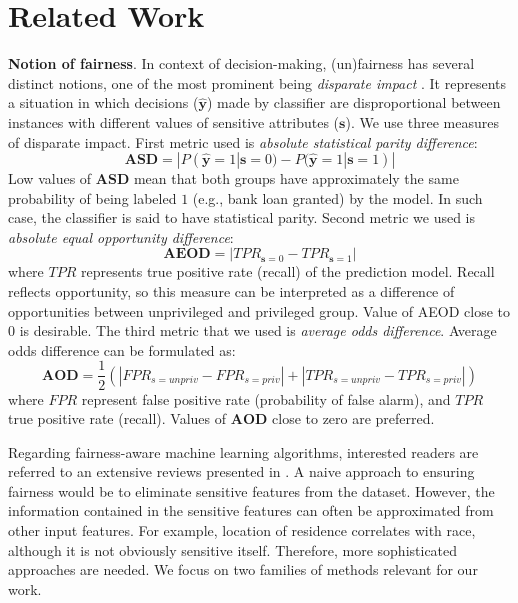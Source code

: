 \documentclass[preprint,12pt]{elsarticle}
\begin{document}
\section{Related Work}
\label{Sec:Related Work}

\textbf{Notion of fairness}. In context of decision-making, (un)fairness has several distinct notions, one of the most prominent being {\em disparate impact} \cite{barocas2016big}. It represents a situation in which decisions ($\hat{\mathbf{y}}$) made by classifier are disproportional between instances with different values of sensitive attributes ($\mathbf{s}$). We use three measures of disparate impact. First metric used is \textit{absolute statistical parity difference}:
\begin{equation}
\mathbf{ASD} = |P(\hat{\mathbf{y}}=1|\mathbf{s}=0) - P(\hat{\mathbf{y}}=1|\mathbf{s}=1)|
\label{metric:asd}
\end{equation}
Low values of $\mathbf{ASD}$ mean that both groups have approximately the same probability of being labeled $1$ (e.g., bank loan granted) by the model. In such case, the classifier is said to have statistical parity.
Second metric we used is \textit{absolute equal opportunity difference}:
\begin{equation}
\mathbf{AEOD} = |TPR_{\mathbf{s}=0} - TPR_{\mathbf{s}=1}|
\label{metric:aeod}
\end{equation}
where $TPR$ represents true positive rate (recall) of the prediction model. Recall reflects opportunity, so this measure can be interpreted as a difference of opportunities between unprivileged and privileged group. Value of AEOD close to 0 is desirable. The third metric that we used is \textit{average odds difference}. Average odds difference can be formulated as:
\begin{equation}
\mathbf{AOD} = \frac{1}{2}(|FPR_{s=unpriv} - FPR_{s=priv}| + |TPR_{s=unpriv} - TPR_{s=priv}|)
\label{metric:aod}
\end{equation}
where $FPR$ represent false positive rate (probability of false alarm), and $TPR$ true positive rate (recall). Values of $\mathbf{AOD}$ close to zero are preferred.

Regarding fairness-aware machine learning algorithms, interested readers are referred to an extensive reviews presented in \cite{friedler2019comparative, bacelar2021monitoring, corbett2018measure, caton2020fairness}. A naive approach to ensuring fairness would be to eliminate sensitive features from the dataset. However, the information contained in the sensitive features can often be approximated from other input features. For example, location of residence correlates with race, although it is not obviously sensitive itself. Therefore, more sophisticated approaches are needed. We focus on two families of methods relevant for our work.
\end{document}
